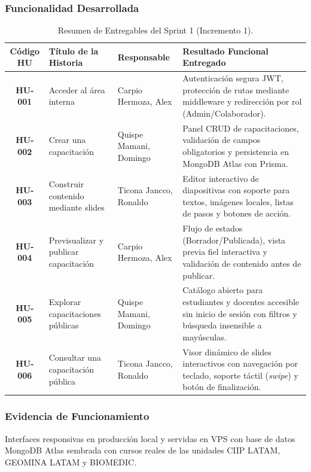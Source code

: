 \documentclass[11pt,a4paper]{article}
\begin{document}
\subsubsection{Funcionalidad Desarrollada}
\begin{table}[H]
\centering
\scriptsize
\renewcommand{\arraystretch}{1.2}
\begin{tabularx}{\linewidth}{|c|>{\raggedright\arraybackslash}p{4.2cm}|>{\raggedright\arraybackslash}p{3.2cm}|>{\raggedright\arraybackslash}X|}
\hline
\rowcolor{gray!15}
\textbf{Código HU} & \textbf{Título de la Historia} & \textbf{Responsable} & \textbf{Resultado Funcional Entregado} \\
\hline
\textbf{HU-001} & Acceder al área interna & Carpio Hermoza, Alex & Autenticación segura JWT, protección de rutas mediante middleware y redirección por rol (Admin/Colaborador). \\
\hline
\textbf{HU-002} & Crear una capacitación & Quispe Mamani, Domingo & Panel CRUD de capacitaciones, validación de campos obligatorios y persistencia en MongoDB Atlas con Prisma. \\
\hline
\textbf{HU-003} & Construir contenido mediante slides & Ticona Jancco, Ronaldo & Editor interactivo de diapositivas con soporte para textos, imágenes locales, listas de pasos y botones de acción. \\
\hline
\textbf{HU-004} & Previsualizar y publicar capacitación & Carpio Hermoza, Alex & Flujo de estados (Borrador/Publicada), vista previa fiel interactiva y validación de contenido antes de publicar. \\
\hline
\textbf{HU-005} & Explorar capacitaciones públicas & Quispe Mamani, Domingo & Catálogo abierto para estudiantes y docentes accesible sin inicio de sesión con filtros y búsqueda insensible a mayúsculas. \\
\hline
\textbf{HU-006} & Consultar una capacitación pública & Ticona Jancco, Ronaldo & Visor dinámico de slides interactivos con navegación por teclado, soporte táctil (\textit{swipe}) y botón de finalización. \\
\hline
\end{tabularx}
\caption{Resumen de Entregables del Sprint 1 (Incremento 1).}
\end{table}

\subsubsection{Evidencia de Funcionamiento}
Interfaces responsivas en producción local y servidas en VPS con base de datos MongoDB Atlas sembrada con cursos reales de las unidades CIIP LATAM, GEOMINA LATAM y BIOMEDIC.
\end{document}
